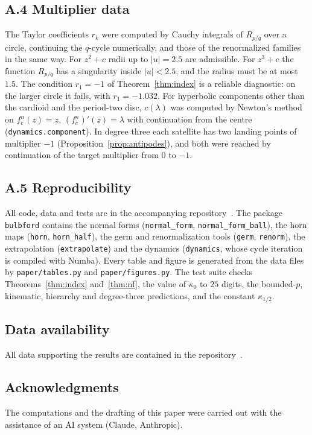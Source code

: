 \documentclass[11pt]{amsart}
\theoremstyle{definition}
\theoremstyle{remark}
\begin{document}
\subsection*{A.4 Multiplier data}
The Taylor coefficients $r_k$ were computed by Cauchy integrals of $R_{p/q}$ over a circle, continuing the $q$-cycle numerically, and those of the renormalized families in the same way. For $z^2+c$ radii up to $|u|=2.5$ are admissible. For $z^3+c$ the function $R_{p/q}$ has a singularity inside $|u|<2.5$, and the radius must be at most $1.5$. The condition $r_1=-1$ of Theorem~\ref{thm:index} is a reliable diagnostic: on the larger circle it fails, with $r_1=-1.032$. For hyperbolic components other than the cardioid and the period-two disc, $c(\lambda)$ was computed by Newton's method on $f_c^n(z)=z$, $(f_c^n)'(z)=\lambda$ with continuation from the centre (\texttt{dynamics.component}). In degree three each satellite has two landing points of multiplier $-1$ (Proposition~\ref{prop:antipodes}), and both were reached by continuation of the target multiplier from $0$ to $-1$.

\subsection*{A.5 Reproducibility}
All code, data and tests are in the accompanying repository~\cite{repo}. The package \texttt{bulbford} contains the normal forms (\texttt{normal\_form}, \texttt{normal\_form\_ball}), the horn maps (\texttt{horn}, \texttt{horn\_half}), the germ and renormalization tools (\texttt{germ}, \texttt{renorm}), the extrapolation (\texttt{extrapolate}) and the dynamics (\texttt{dynamics}, whose cycle iteration is compiled with Numba). Every table and figure is generated from the data files by \texttt{paper/tables.py} and \texttt{paper/figures.py}. The test suite checks Theorems~\ref{thm:index} and~\ref{thm:nf}, the value of $\kappa_0$ to $25$ digits, the bounded-$p$, kinematic, hierarchy and degree-three predictions, and the constant $\kappa_{1/2}$.

\subsection*{Data availability}
All data supporting the results are contained in the repository~\cite{repo}.

\subsection*{Acknowledgments}
The computations and the drafting of this paper were carried out with the assistance of an AI system (Claude, Anthropic).
\end{document}
